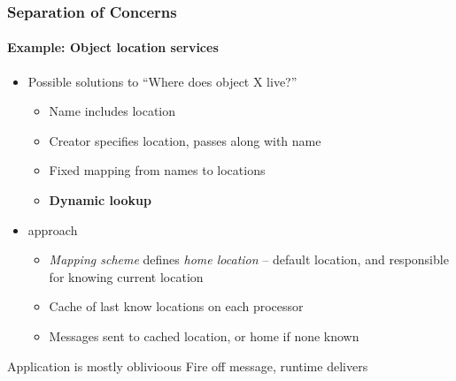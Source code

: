 \begin{frame}
\frametitle{Separation of Concerns}
\framesubtitle{Example: Object location services}
\begin{itemize}[<+->]
\item Possible solutions to ``Where does object X live?''
\begin{itemize}[<+->]
\item Name includes location
\item Creator specifies location, passes along with name
\item Fixed mapping from names to locations
\item \textbf{Dynamic lookup}
\end{itemize}
\item \charm approach
\begin{itemize}
\item \emph{Mapping scheme} defines \emph{home location} -- default location, and responsible for knowing current location
\item Cache of last know locations on each processor
\item Messages sent to cached location, or home if none known
\end{itemize}
\end{itemize}
\pause
\begin{block}{Application is mostly oblivioous}
Fire off message, runtime delivers
\end{block}
\end{frame}
